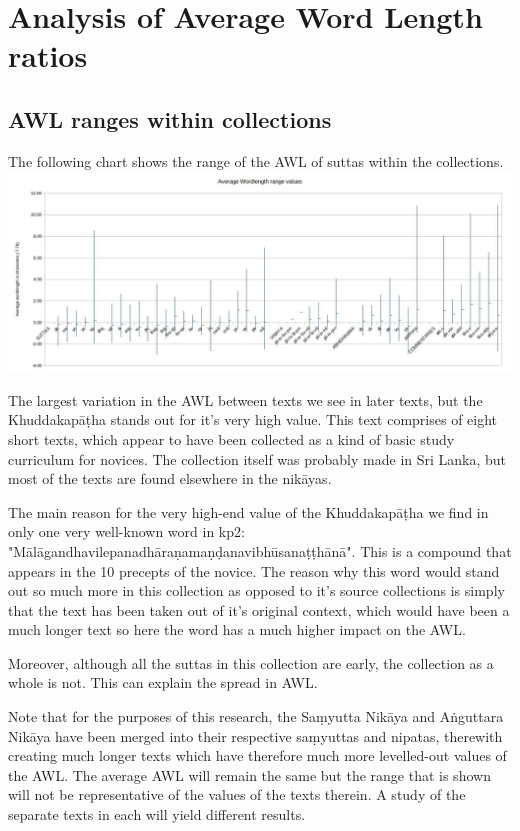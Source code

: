 \section{Analysis of Average Word Length ratios}
\subsection{AWL ranges within collections}
The following chart shows the range of the AWL of suttas within the collections.\\

\includegraphics[width=\linewidth]{minmax.jpg}
\label{minmax}

\medskip
The largest variation in the AWL between texts we see in later texts, but the Khuddakapāṭha stands out for it's very high value. This text comprises of eight short texts, which appear to have been collected as a kind of basic study curriculum for novices. The collection itself was probably made in Sri Lanka, but most of the texts are found elsewhere in the nikāyas.

The main reason for the very high-end value of the Khuddakapāṭha we find in only one very well-known word in kp2: "Mālāgandhavilepanadhāraṇamaṇḍanavibhūsanaṭṭhānā". This is a compound that appears in the 10 precepts of the novice. The reason why this word would stand out so much more in this collection as opposed to it's source collections is simply that the text has been taken out of it's original context, which would have been a much longer text so here the word has a much higher impact on the AWL. 

Moreover, although all the suttas in this collection are early, the collection as a whole is not. This can explain the spread in AWL.

Note that for the purposes of this research, the Saṃyutta Nikāya and Aṅguttara Nikāya have been merged into their respective saṃyuttas and nipatas, therewith creating much longer texts which have therefore much more levelled-out values of the AWL. The average AWL will remain the same but the range that is shown will not be representative of the values of the texts therein. A study of the separate texts in each will yield different results.

